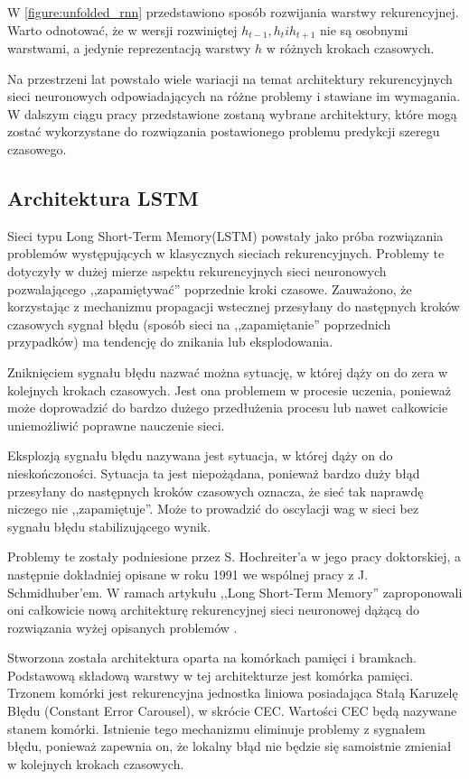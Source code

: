 \documentclass[10pt,a4paper]{article}
\begin{document}
W \autoref{figure:unfolded_rnn} przedstawiono sposób rozwijania warstwy rekurencyjnej. Warto odnotować, że w wersji rozwiniętej $h_{t-1}, h_t i h_{t+1}$ nie są osobnymi warstwami, a jedynie reprezentacją warstwy $h$ w różnych krokach czasowych. 

Na przestrzeni lat powstało wiele wariacji na temat architektury rekurencyjnych sieci neuronowych odpowiadających na różne problemy i stawiane im wymagania. W dalszym ciągu pracy przedstawione zostaną wybrane architektury, które mogą zostać wykorzystane do rozwiązania postawionego problemu predykcji szeregu czasowego.


\subsection{Architektura LSTM}
Sieci typu Long Short-Term Memory(LSTM) powstały jako próba rozwiązania problemów występujących w klasycznych sieciach rekurencyjnych. Problemy te dotyczyły w dużej mierze aspektu rekurencyjnych sieci neuronowych pozwalającego ,,zapamiętywać'' poprzednie kroki czasowe. Zauważono, że korzystając z mechanizmu propagacji wstecznej przesyłany do następnych kroków czasowych sygnał błędu (sposób sieci na ,,zapamiętanie'' poprzednich przypadków) ma tendencję do znikania lub eksplodowania. 

Zniknięciem sygnału błędu nazwać można sytuację, w której dąży on do zera w kolejnych krokach czasowych. Jest ona problemem w procesie uczenia, ponieważ może doprowadzić do bardzo dużego przedłużenia procesu lub nawet całkowicie uniemożliwić poprawne nauczenie sieci.

Eksplozją sygnału błędu nazywana jest sytuacja, w której dąży on do nieskończoności. Sytuacja ta jest niepożądana, ponieważ bardzo duży błąd przesyłany do następnych kroków czasowych oznacza, że sieć tak naprawdę niczego nie ,,zapamiętuje''. Może to prowadzić do oscylacji wag w sieci bez sygnału błędu stabilizującego wynik. 

Problemy te zostały podniesione przez S. Hochreiter'a w jego pracy doktorskiej, a następnie dokładniej opisane w roku 1991 we wspólnej pracy z J. Schmidhuber'em. 
W ramach artykułu ,,Long Short-Term Memory'' zaproponowali oni całkowicie nową architekturę rekurencyjnej sieci neuronowej dążącą do rozwiązania wyżej opisanych problemów \cite{hochreiter1997long}.

Stworzona została architektura oparta na komórkach pamięci i bramkach. Podstawową składową warstwy w tej architekturze jest komórka pamięci. Trzonem komórki jest rekurencyjna jednostka liniowa posiadająca Stałą Karuzelę Błędu (Constant Error Carousel), w skrócie CEC. Wartości CEC będą nazywane stanem komórki. Istnienie tego mechanizmu eliminuje problemy z sygnałem błędu, ponieważ zapewnia on, że lokalny błąd nie będzie się samoistnie zmieniał w kolejnych krokach czasowych.
\end{document}
